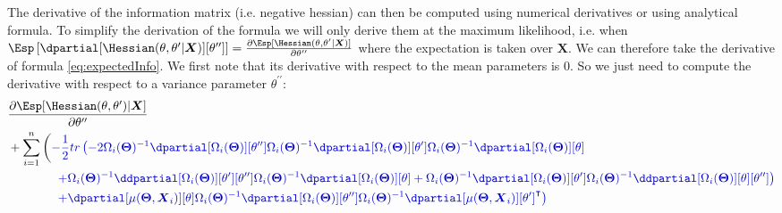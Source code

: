 \documentclass[12pt]{article}
\newcommand{\darkblue}{blue!80!black}
\newcommand{\darkred}{red!50!black}
\newcommand\trans[1]{{#1}^\intercal}%
\newcommand{\param}{\Theta}
\newcommand{\Vparam}{\boldsymbol{\param}}
\newcommand{\VX}{\boldsymbol{X}}
\begin{document}
The derivative of the information matrix (i.e. negative hessian) can
then be computed using numerical derivatives or using analytical
formula. To simplify the derivation of the formula we will only derive
them at the maximum likelihood, i.e. when
\(\Esp\left[\dpartial[\Hessian(\theta,\theta^{\prime}|\VX)][\theta^{\prime\prime}]\right]=\frac{\partial
\Esp[\Hessian(\theta,\theta^{\prime}|\VX)]}{\partial
\theta^{\prime\prime}}\) where the expectation is taken over
\(\VX\). We can therefore take the derivative of formula
\eqref{eq:expectedInfo}. We first note that its derivative with respect
to the mean parameters is 0. So we just need to compute the derivative
with respect to a variance parameter \(\theta^{\prime\prime}\):
\begin{align*}
 & \frac{\partial\Esp[\Hessian(\theta,\theta^{\prime})|\VX]}{\partial \theta^{\prime\prime}} \notag\\ 
 & + \sum_{i=1}^n \left( \textcolor{\darkblue}{
- \frac{1}{2} tr\left(
-2\Omega_i(\Vparam)^{-1} \dpartial[\Omega_i(\Vparam)][\theta^{\prime\prime}] \Omega_i(\Vparam)^{-1} \dpartial[\Omega_i(\Vparam)][\theta^{\prime}] \Omega_i(\Vparam)^{-1} \dpartial[\Omega_i(\Vparam)][\theta] \right. } \right. \\
& \qquad \qquad \textcolor{\darkblue}{\left. + \Omega_i(\Vparam)^{-1} \ddpartial[\Omega_i(\Vparam)][\theta^{\prime}][\theta^{\prime\prime}] \Omega_i(\Vparam)^{-1} \dpartial[\Omega_i(\Vparam)][\theta]
+ \Omega_i(\Vparam)^{-1} \dpartial[\Omega_i(\Vparam)][\theta^{\prime}] \Omega_i(\Vparam)^{-1} \ddpartial[\Omega_i(\Vparam)][\theta][\theta^{\prime\prime}]
\right)} \\
& \qquad \qquad  \textcolor{\darkblue}{\left. + \dpartial[\mu(\Vparam,\VX_i)][\theta] \Omega_i(\Vparam)^{-1} \dpartial[\Omega_i(\Vparam)][\theta^{\prime\prime}] \Omega_i(\Vparam)^{-1}   \trans{\dpartial[\mu(\Vparam,\VX_i)][\theta^{\prime}]}
 \right)}
\end{align*}
\end{document}
